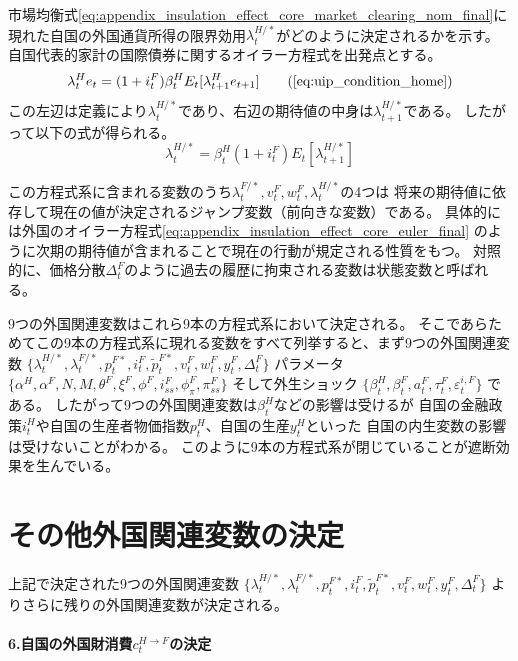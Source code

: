 市場均衡式\eqref{eq:appendix_insulation_effect_core_market_clearing_nom_final}に現れた自国の外国通貨所得の限界効用\(\lambda_t^{H/*}\)がどのように決定されるかを示す。
自国代表的家計の国際債券に関するオイラー方程式を出発点とする。
\begin{equation}
    \lambda_t^He_t=(1+i_t^F)\beta_t^HE_t[\lambda_{t+1}^He_{t+1}]
    \tag{\ref{eq:uip_condition_home}}
\end{equation}
この左辺は定義により\(\lambda_t^{H/*}\)であり、右辺の期待値の中身は\(\lambda_{t+1}^{H/*}\)である。
したがって以下の式が得られる。
\begin{equation}
    \lambda_t^{H/*}=\beta_t^H(1+i_t^F)E_t[\lambda_{t+1}^{H/*}]
    \label{eq:appendix_insulation_effect_uip_final}
\end{equation}

この方程式系に含まれる変数のうち\(\lambda_t^{F/*},v_t^F,w_t^F,\lambda_t^{H/*}\)の4つは
将来の期待値に依存して現在の値が決定されるジャンプ変数（前向きな変数）である。
具体的には外国のオイラー方程式\eqref{eq:appendix_insulation_effect_core_euler_final}
のように次期の期待値が含まれることで現在の行動が規定される性質をもつ。
対照的に、価格分散\(\Delta_t^F\)のように過去の履歴に拘束される変数は状態変数と呼ばれる。

9つの外国関連変数はこれら9本の方程式系において決定される。
そこであらためてこの9本の方程式系に現れる変数をすべて列挙すると、まず9つの外国関連変数
\(\{\lambda_t^{H/*},\lambda_t^{F/*},p_t^{F*},i_t^F,\widetilde{p}_t^{F*},v_t^F,w_t^F,y_t^F,\Delta_t^F\}\)
パラメータ
\(\{\alpha^H,\alpha^F,N,M, \theta^F,\xi^F,\phi^F,i_{ss}^F,\phi_{\pi}^F,\pi_{ss}^F\}\)
そして外生ショック
\(\{\beta_t^H,\beta_t^F,a_t^F, \tau_t^F,\varepsilon_t^{i,F}\}\)
である。
したがって9つの外国関連変数は\(\beta_t^H\)などの影響は受けるが
自国の金融政策\(i_t^H\)や自国の生産者物価指数\(p_t^H\)、自国の生産\(y_t^H\)といった
自国の内生変数の影響は受けないことがわかる。
このように9本の方程式系が閉じていることが遮断効果を生んでいる。

\section{その他外国関連変数の決定}
\label{sec:appendix_insulation_effect_other}
上記で決定された9つの外国関連変数
\(\{\lambda_t^{H/*},\lambda_t^{F/*},p_t^{F*},i_t^F,\widetilde{p}_t^{F*},v_t^F,w_t^F,y_t^F,\Delta_t^F\}\)
よりさらに残りの外国関連変数が決定される。

\paragraph{6.自国の外国財消費\(c_t^{H\to F}\)の決定}
\label{sec:appendix_insulation_effect_other_chf}

